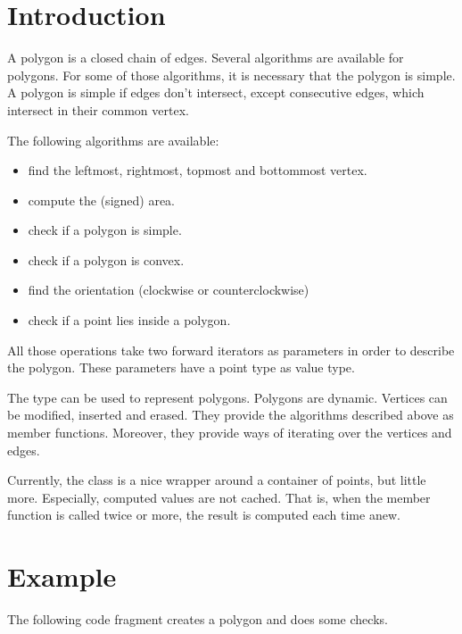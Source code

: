 


\section{Introduction}

A polygon is a closed chain of edges. Several algorithms are available for
polygons. For some of those algorithms, it is necessary that the polygon is
simple. A polygon is simple if edges don't intersect, except consecutive edges,
which intersect in their common vertex.

The following algorithms are available:
\begin{itemize}
\item find the leftmost, rightmost, topmost and bottommost vertex.
\item compute the (signed) area.
\item check if a polygon is simple.
\item check if a polygon is convex.
\item find the orientation (clockwise or counterclockwise)
\item check if a point lies inside a polygon.
\end{itemize}
All those operations take two forward iterators as parameters in order to
describe the polygon. These parameters have a point type as value type.

The type  can be used to represent polygons.
Polygons are dynamic. Vertices can be modified, inserted and erased.
They provide the algorithms described above as member functions.
Moreover, they provide ways of iterating over the vertices and edges.

Currently, the  class is a nice wrapper around a container of
points, but little more. Especially, computed values are not cached.
That is, when the  member function is called twice or more,
the result is computed each time anew. 

\section{Example}

The following code fragment creates a polygon and does some checks.




